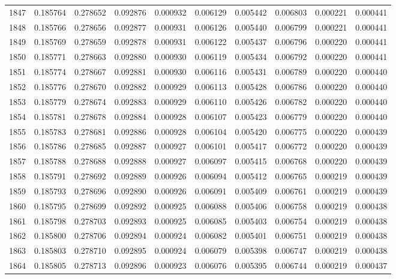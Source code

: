 \begin{tabular}{lrrrrrrrrr}
1847 & 0.185764 & 0.278652 & 0.092876 & 0.000932 & 0.006129 & 0.005442 & 0.006803 & 0.000221 & 0.000441 \\
1848 & 0.185766 & 0.278656 & 0.092877 & 0.000931 & 0.006126 & 0.005440 & 0.006799 & 0.000221 & 0.000441 \\
1849 & 0.185769 & 0.278659 & 0.092878 & 0.000931 & 0.006122 & 0.005437 & 0.006796 & 0.000220 & 0.000441 \\
1850 & 0.185771 & 0.278663 & 0.092880 & 0.000930 & 0.006119 & 0.005434 & 0.006792 & 0.000220 & 0.000441 \\
1851 & 0.185774 & 0.278667 & 0.092881 & 0.000930 & 0.006116 & 0.005431 & 0.006789 & 0.000220 & 0.000440 \\
1852 & 0.185776 & 0.278670 & 0.092882 & 0.000929 & 0.006113 & 0.005428 & 0.006786 & 0.000220 & 0.000440 \\
1853 & 0.185779 & 0.278674 & 0.092883 & 0.000929 & 0.006110 & 0.005426 & 0.006782 & 0.000220 & 0.000440 \\
1854 & 0.185781 & 0.278678 & 0.092884 & 0.000928 & 0.006107 & 0.005423 & 0.006779 & 0.000220 & 0.000440 \\
1855 & 0.185783 & 0.278681 & 0.092886 & 0.000928 & 0.006104 & 0.005420 & 0.006775 & 0.000220 & 0.000439 \\
1856 & 0.185786 & 0.278685 & 0.092887 & 0.000927 & 0.006101 & 0.005417 & 0.006772 & 0.000220 & 0.000439 \\
1857 & 0.185788 & 0.278688 & 0.092888 & 0.000927 & 0.006097 & 0.005415 & 0.006768 & 0.000220 & 0.000439 \\
1858 & 0.185791 & 0.278692 & 0.092889 & 0.000926 & 0.006094 & 0.005412 & 0.006765 & 0.000219 & 0.000439 \\
1859 & 0.185793 & 0.278696 & 0.092890 & 0.000926 & 0.006091 & 0.005409 & 0.006761 & 0.000219 & 0.000439 \\
1860 & 0.185795 & 0.278699 & 0.092892 & 0.000925 & 0.006088 & 0.005406 & 0.006758 & 0.000219 & 0.000438 \\
1861 & 0.185798 & 0.278703 & 0.092893 & 0.000925 & 0.006085 & 0.005403 & 0.006754 & 0.000219 & 0.000438 \\
1862 & 0.185800 & 0.278706 & 0.092894 & 0.000924 & 0.006082 & 0.005401 & 0.006751 & 0.000219 & 0.000438 \\
1863 & 0.185803 & 0.278710 & 0.092895 & 0.000924 & 0.006079 & 0.005398 & 0.006747 & 0.000219 & 0.000438 \\
1864 & 0.185805 & 0.278713 & 0.092896 & 0.000923 & 0.006076 & 0.005395 & 0.006744 & 0.000219 & 0.000437 \\

\end{tabular}
